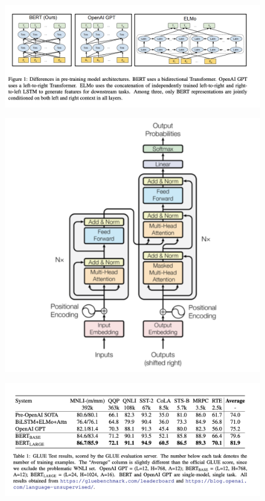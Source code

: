 \documentclass{article}
\begin{document}
\begin{figure}[!ht]
\centering
\includegraphics[scale=0.7]{../figures/BERT_architecture_comparsion}
\label{fig:bert_architecture_comparison}
\end{figure}


\begin{figure}[!ht]
\centering
\includegraphics[scale=0.7]{../figures/Transformers}
\label{fig:transformers}
\end{figure}

\begin{figure}[!ht]
\centering
\includegraphics[scale=0.7]{../figures/BERT_GLUE_results}
\label{fig:bert_glue_results}
\end{figure}
\end{document}
